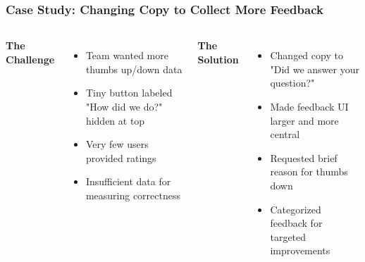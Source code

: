 \begin{frame}
    \frametitle{Case Study: Changing Copy to Collect More Feedback}
    
    \begin{columns}
        \textbf{The Challenge}
        \begin{itemize}
            \item Team wanted more thumbs up/down data
            \item Tiny button labeled "How did we do?" hidden at top
            \item Very few users provided ratings
            \item Insufficient data for measuring correctness
        \end{itemize}
        
        \textbf{The Solution}
        \begin{itemize}
            \item Changed copy to "Did we answer your question?"
            \item Made feedback UI larger and more central
            \item Requested brief reason for thumbs down
            \item Categorized feedback for targeted improvements
        \end{itemize}
    \end{columns}
    
    \vspace{0.3cm}
    \begin{center}
    \end{center}
\end{frame}


